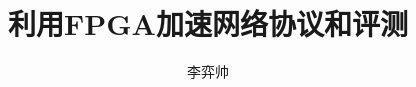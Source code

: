 \documentclass[bachelor]{ustcthesis}
\title{利用FPGA加速网络协议和评测}
\author{李弈帅}
\begin{document}
\maketitle

%
%
%
\frontmatter


\mainmatter
\tableofcontents
\listoffigures
\listoftables
\listofalgorithms  %

% 
















\appendix

%
\end{document}
